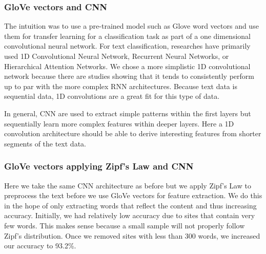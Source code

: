 \documentclass[12pt]{article}
\begin{document}
\subsubsection{GloVe vectors and CNN}

The intuition was to use a pre-trained model such as Glove word vectors and use them for transfer learning for a classification task as part of a one dimensional convolutional neural network. For text classification, researches have primarily used 1D Convolutional Neural Network, Recurrent Neural Networks, or Hierarchical Attention Networks. We chose a more simplistic 1D convolutional network because there are studies showing that it tends to consistently perform up to par with the more complex RNN architectures. Because text data is sequential data, 1D convolutions are a great fit for this type of data. 

In general, CNN are used to extract simple patterns within the first layers but sequentially learn more complex features within deeper layers. Here a 1D convolution architecture should be able to derive interesting features from shorter segments of the text data.

\subsubsection{GloVe vectors applying Zipf's Law and CNN}

Here we take the same CNN architecture as before but we apply Zipf's Law to preprocess the text before we use GloVe vectors for feature extraction. We do this in the hope of only extracting words that reflect the content and thus increasing accuracy. Initially, we had relatively low accuracy due to sites that contain very few words. This makes sense because a small sample will not properly follow Zipf's distribution. Once we removed sites with less than 300 words, we increased our accuracy to 93.2\%.
\end{document}
